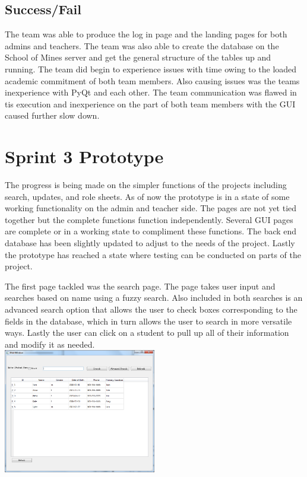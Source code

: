 \subsection{Success/Fail}
The team was able to produce the log in page and the landing pages for both admins and teachers. The team was also able to create the database on the School of Mines server and get the general structure of the tables up and running. The team did begin to experience issues with time owing to the loaded academic commitment of both team members. Also causing issues was the teams inexperience with PyQt and each other. The team communication was flawed in tis execution and inexperience on the part of both team members with the GUI caused further slow down.\\


\section{Sprint 3 Prototype}
The progress is being made on the simpler functions of the projects including search, updates, and role sheets. As of now the prototype is in a state of some working functionality on the admin and teacher side. The pages are not yet tied together but the complete functions function independently. Several GUI pages are complete or in a working state to compliment these functions. The back end database has been slightly updated to adjust to the needs of the project. Lastly the prototype has reached a state where testing can be conducted on parts of the project.

The first page tackled was the search page. The page takes user input and searches based on name using a fuzzy search. Also included in both searches is an advanced search option that allows the user to check boxes corresponding to the fields in the database, which in turn allows the user to search in more versatile ways. Lastly the user can click on a student to pull up all of their information and modify it as needed.\\

\includegraphics[width=0.5\textwidth]{search.png}

